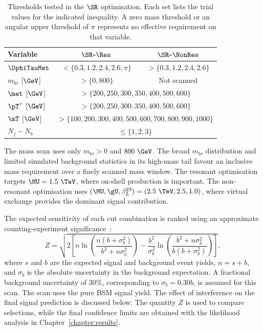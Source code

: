 \begin{table}[htbp]
    \centering
    \small
    \caption{Thresholds tested in the $\SR$ optimisation. Each set lists the trial values for the indicated inequality. A zero mass threshold or an angular upper threshold of $\pi$ represents no effective requirement on that variable.}
    \label{tab:ch7_scan_variables}
    \begin{tabular}{lcc}
        \toprule
        Variable & $\SR$-$\Res$ & $\SR$-$\NonRes$ \\
        \midrule
        $\DphiTauMet$ & $<\{0.3,1.2,2.4,2.6,\pi\}$ & $>\{0.3,1.2,2.4,2.6\}$ \\
        $m_{b\tau}$ [$\GeV$] & $>\{0,800\}$ & Not scanned \\
        $\met$ [$\GeV$] & \multicolumn{2}{c}{$>\{200,250,300,350,400,500,600\}$} \\
        $\pT^\tau$ [$\GeV$] & \multicolumn{2}{c}{$>\{200,250,300,350,400,500,600\}$} \\
        $\mT$ [$\GeV$] & \multicolumn{2}{c}{$>\{100,200,300,400,500,600,700,800,900,1000\}$} \\
        $N_j-N_b$ & \multicolumn{2}{c}{$\leq\{1,2,3\}$} \\
        \bottomrule
    \end{tabular}
\end{table}

The mass scan uses only $m_{b\tau}>0$ and $800~\GeV$.
The broad $m_{b\tau}$ distribution and limited simulated background statistics in its high-mass tail favour an inclusive mass requirement over a finely scanned mass window.
The resonant optimisation targets $\MU=1.5~\TeV$, where on-shell production is important.
The non-resonant optimisation uses $(\MU,\gU,\beta_L^{23})=(2.5~\TeV,2.5,1.0)$, where virtual exchange provides the dominant signal contribution.

The expected sensitivity of each cut combination is ranked using an approximate counting-experiment significance~\cite{ATL-PHYS-PUB-2020-025}:
\begin{equation}
    Z = \sqrt{2\left[n\ln\!\left(\frac{n(b+\sigma_b^2)}{b^2+n\sigma_b^2}\right)-\frac{b^2}{\sigma_b^2}\ln\!\left(\frac{b^2+n\sigma_b^2}{b(b+\sigma_b^2)}\right)\right]},
    \label{eq:ch7_optimisation_significance}
\end{equation}
where $s$ and $b$ are the expected signal and background event yields, $n=s+b$, and $\sigma_b$ is the absolute uncertainty in the background expectation.
A fractional background uncertainty of $30\%$, corresponding to $\sigma_b=0.30b$, is assumed for this scan.
The scan uses the pure BSM signal yield.
The effect of interference on the final signal prediction is discussed below.
The quantity $Z$ is used to compare selections, while the final confidence limits are obtained with the likelihood analysis in Chapter~\ref{chapter:results}.

